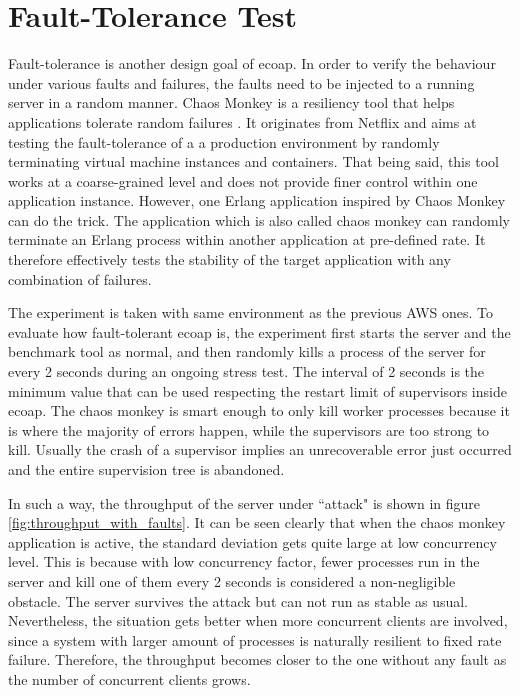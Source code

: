 \section{Fault-Tolerance Test}

Fault-tolerance is another design goal of ecoap. In order to verify the behaviour under various faults and failures, the faults need to be injected to a running server in a random manner. Chaos Monkey is a resiliency tool that helps applications tolerate random failures \cite{chaos_monkey_netflix}. It originates from Netflix and aims at testing the fault-tolerance of a a production environment by randomly terminating virtual machine instances and containers. That being said, this tool works at a coarse-grained level and does not provide finer control within one application instance. However, one Erlang application inspired by Chaos Monkey can do the trick. The application which is also called chaos monkey \cite{chaos_monkey_erl} can randomly terminate an Erlang process within another application at pre-defined rate. It therefore effectively tests the stability of the target application with any combination of failures. 

The experiment is taken with same environment as the previous AWS ones. To evaluate how fault-tolerant ecoap is, the experiment first starts the server and the benchmark tool as normal, and then randomly kills a process of the server for every 2 seconds during an ongoing stress test. The interval of 2 seconds is the minimum value that can be used respecting the restart limit of supervisors inside ecoap. The chaos monkey is smart enough to only kill worker processes because it is where the majority of errors happen, while the supervisors are too strong to kill. Usually the crash of a supervisor implies an unrecoverable error just occurred and the entire supervision tree is abandoned. 

In such a way, the throughput of the server under ``attack" is shown in figure \ref{fig:throughput_with_faults}. It can be seen clearly that when the chaos monkey application is active, the standard deviation gets quite large at low concurrency level. This is because with low concurrency factor, fewer processes run in the server and kill one of them every 2 seconds is considered a non-negligible obstacle. The server survives the attack but can not run as stable as usual. Nevertheless, the situation gets better when more concurrent clients are involved, since a system with larger amount of processes is naturally resilient to fixed rate failure. Therefore, the throughput becomes closer to the one without any fault as the number of concurrent clients grows. 

